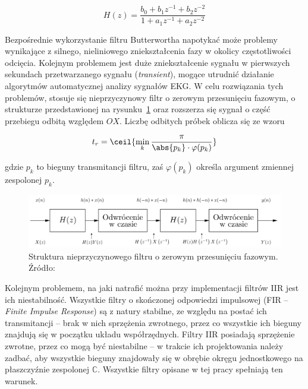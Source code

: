 \begin{equation}
H(z) = \frac{b_0 + b_1z^{-1} + b_2z^{-2}}{1 + a_1z^{-1} + a_2z^{-2}}
\end{equation}

Bezpośrednie wykorzystanie filtru Butterwortha napotykać może problemy wynikające z silnego, nieliniowego zniekształcenia fazy w okolicy częstotliwości odcięcia. Kolejnym problemem jest duże zniekształcenie sygnału w pierwszych sekundach przetwarzanego sygnału (\emph{transient}), mogące utrudnić działanie algorytmów automatycznej analizy sygnałów EKG. W celu rozwiązania tych problemów, stosuje się nieprzyczynowy filtr o zerowym przesunięciu fazowym, o strukturze przedstawionej na rysunku~\ref{fig:0phase} oraz rozszerza się sygnał o część przebiegu odbitą względem $OX$. Liczbę odbitych próbek oblicza się ze wzoru

\begin{equation}
t_r = \ceil{\min_k\frac{\pi}{\abs{p_k} \cdot \varphi(p_k)}}
\end{equation}

gdzie $p_k$ to bieguny transmitancji filtru, zaś $\varphi(p_k)$ określa argument zmiennej zespolonej $p_k$.

\begin{figure}[H]
\centering
	\includegraphics[width=\textwidth]{ECG_BASELINE/figures/butter_0phase.png}
\caption{Struktura nieprzyczynowego filtru o zerowym przesunięciu fazowym. Źródło: \cite{Baseline2013}}
\label{fig:0phase}
\end{figure}

Kolejnym problemem, na jaki natrafić można przy implementacji filtrów IIR jest ich niestabilność. Wszystkie filtry o skończonej odpowiedzi impulsowej (FIR -- \emph{Finite Impulse Response}) są z natury stabilne, ze względu na postać ich transmitancji -- brak w nich sprzężenia zwrotnego, przez co wszystkie ich bieguny znajdują się w początku układu współrzędnych. Filtry IIR posiadają sprzężenie zwrotne, przez co mogą być niestabilne -- w trakcie ich projektowania należy zadbać, aby wszystkie bieguny znajdowały się w obrębie okręgu jednostkowego na płaszczyźnie zespolonej $\mathbb{C}$. Wszystkie filtry opisane w tej pracy spełniają ten warunek.

